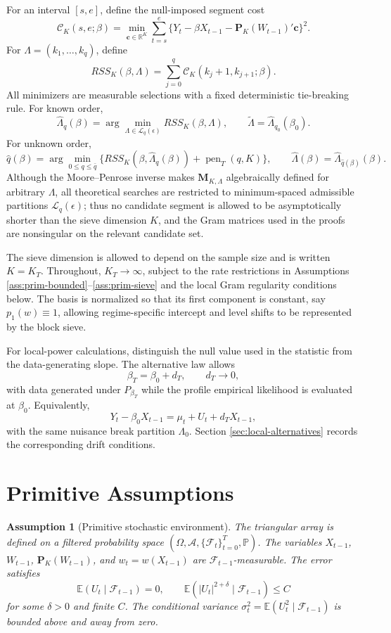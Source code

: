 \documentclass[12pt]{article}
\numberwithin{equation}{section}
\newtheorem{assumption}{Assumption}
\theoremstyle{definition}
\newcommand{\R}{\mathbb R}
\newcommand{\E}{\mathbb E}
\newcommand{\Pp}{\mathbb P}
\newcommand{\F}{\mathcal F}
\begin{document}
For an interval \([s,e]\), define the null-imposed segment cost
\[
    \mathcal C_K(s,e;\beta)
    =
    \min_{\bm c\in\R^K}
    \sum_{t=s}^e
    \{Y_t-\beta X_{t-1}-\bm P_K(W_{t-1})'\bm c\}^2.
\]
For \(\Lambda=(k_1,\ldots,k_q)\), define
\[
    RSS_K(\beta,\Lambda)
    =
    \sum_{j=0}^q
    \mathcal C_K(k_j+1,k_{j+1};\beta).
\]
All minimizers are measurable selections with a fixed deterministic tie-breaking rule. For known order,
\[
    \widehat\Lambda_q(\beta)
    =
    \arg\min_{\Lambda\in\mathcal L_q(\epsilon)}
    RSS_K(\beta,\Lambda),
    \qquad
    \widetilde\Lambda=\widehat\Lambda_{q_0}(\beta_0).
\]
For unknown order,
\[
    \widehat q(\beta)
    =
    \arg\min_{0\leq q\leq \bar q}
    \{RSS_K(\beta,\widehat\Lambda_q(\beta))+\operatorname{pen}_T(q,K)\},
    \qquad
    \widehat\Lambda(\beta)=\widehat\Lambda_{\widehat q(\beta)}(\beta).
\]
Although the Moore--Penrose inverse makes \(\bm M_{K,\Lambda}\) algebraically defined for arbitrary \(\Lambda\), all theoretical searches are restricted to minimum-spaced admissible partitions \(\mathcal L_q(\epsilon)\); thus no candidate segment is allowed to be asymptotically shorter than the sieve dimension \(K\), and the Gram matrices used in the proofs are nonsingular on the relevant candidate set.

The sieve dimension is allowed to depend on the sample size and is written \(K=K_T\). Throughout, \(K_T\to\infty\), subject to the rate restrictions in Assumptions \ref{ass:prim-bounded}--\ref{ass:prim-sieve} and the local Gram regularity conditions below. The basis is normalized so that its first component is constant, say \(p_1(w)\equiv1\), allowing regime-specific intercept and level shifts to be represented by the block sieve.

For local-power calculations, distinguish the null value used in the statistic from the data-generating slope. The alternative law allows
\[
    \beta_T=\beta_0+d_T,
    \qquad
    d_T\to0,
\]
with data generated under \(P_{\beta_T}\) while the profile empirical likelihood is evaluated at \(\beta_0\). Equivalently,
\[
    Y_t-\beta_0X_{t-1}=\mu_t+U_t+d_TX_{t-1},
\]
with the same nuisance break partition \(\Lambda_0\). Section \ref{sec:local-alternatives} records the corresponding drift conditions.

\section{Primitive Assumptions}

\begin{assumption}[Primitive stochastic environment]
\label{ass:prim-stoch}
The triangular array is defined on a filtered probability space
\((\Omega,\mathcal A,\{\F_t\}_{t=0}^T,\Pp)\). The variables \(X_{t-1}\), \(W_{t-1}\), \(\bm P_K(W_{t-1})\), and \(w_t=w(X_{t-1})\) are \(\F_{t-1}\)-measurable. The error satisfies
\[
    \E(U_t\mid \F_{t-1})=0,
    \qquad
    \E(|U_t|^{2+\delta}\mid \F_{t-1})\leq C
\]
for some \(\delta>0\) and finite \(C\). The conditional variance \(\sigma_t^2=\E(U_t^2\mid\F_{t-1})\) is bounded above and away from zero.
\end{assumption}
\end{document}
